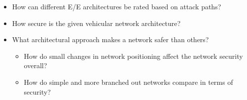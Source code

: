 \begin{itemize}
    \item How can different E/E architectures be rated based on attack paths?
    \item How secure is the given vehicular network architecture?
    \item What architectural approach makes a network safer than others?
    \begin{itemize}
        \item How do small changes in network positioning affect the network security overall?
        \item How do simple and more branched out networks compare in terms of security?
    \end{itemize}
\end{itemize}